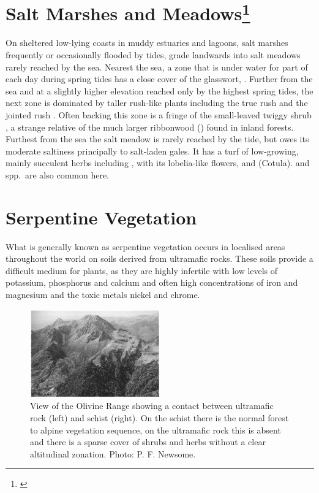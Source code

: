\section[Salt Marshes and Meadows]{Salt Marshes and Meadows\footnote{\cite{moore1963plants}}}

On sheltered low-lying coasts in muddy estuaries and lagoons, salt marshes frequently or occasionally flooded by tides, grade landwards into salt meadows rarely reached by the sea.
Nearest the sea, a zone that is under water for part of each day during spring tides has a close cover of the glasswort, .
Further from the sea and at a slightly higher elevation reached only by the highest spring tides, the next zone is dominated by taller rush-like plants including the true rush  and the jointed rush .
Often backing this zone is a fringe of the small-leaved twiggy shrub , a strange relative of the much larger ribbonwood () found in inland forests.
Furthest from the sea the salt meadow is rarely reached by the tide, but owes its moderate saltiness principally to salt-laden gales.
It has a turf of low-growing, mainly succulent herbs including ,  with its lobelia-like flowers,  and  (Cotula).  and  spp.\ are also common here.

\section{Serpentine Vegetation}

What is generally known as serpentine vegetation occurs in localised areas throughout the world on soils derived from ultramafic rocks.
These soils provide a difficult medium for plants, as they are highly infertile with low levels of potassium, phosphorus and calcium and often high concentrations of iron and magnesium and the toxic metals nickel and chrome.

\begin{figure}
	\includegraphics[width=0.5\textwidth]{graphics/figure89olivine-range.jpg}
	\centering
	\caption[View of the Olivine Range]{View of the Olivine Range showing a contact between ultramafic rock (left) and schist (right).
	On the schist there is the normal forest to alpine vegetation sequence, on the ultramafic rock this is absent and there is a sparse cover of shrubs and herbs without a clear altitudinal zonation.
	Photo: P. F. Newsome.}%
	\label{fig:89olivine-range}
\end{figure}


